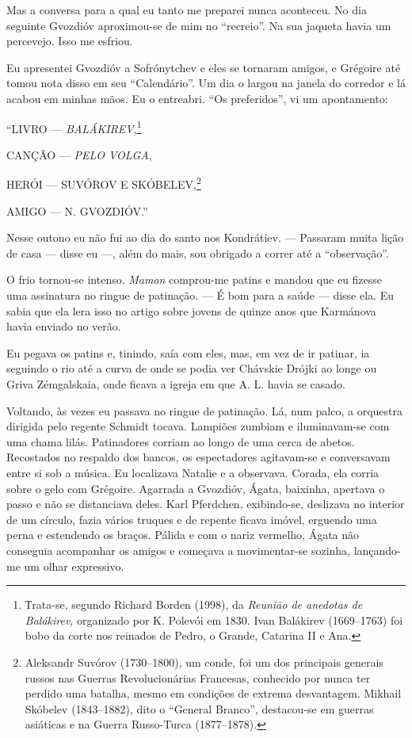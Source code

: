 Mas a conversa para a qual eu tanto me preparei nunca aconteceu. No dia
seguinte Gvozdióv aproximou-se de mim no ``recreio''. Na sua jaqueta
havia um percevejo. Isso me esfriou.

Eu apresentei Gvozdióv a Sofrónytchev e eles se tornaram amigos, e
Grégoire até tomou nota disso em seu ``Calendário''. Um dia o largou na
janela do corredor e lá acabou em minhas mãos. Eu o entreabri. ``Os
preferidos'', vi um apontamento:

``LIVRO --- \emph{BALÁKIREV},\footnote{Тrata-se, segundo Richard Borden
  (1998), da \emph{Reunião de anedotas de Balákirev}, organizado por K.
  Polevói em 1830. Ivan Balákirev (1669--1763) foi bobo da corte nos
  reinados de Pedro, o Grande, Catarina II e Ana.}

CANÇÃO --- \emph{PELO VOLGA},

HERÓI --- SUVÓROV E SKÓBELEV,\footnote{Aleksandr Suvórov (1730--1800),
  um conde, foi um dos principais generais russos nas Guerras
  Revolucionárias Francesas, conhecido por nunca ter perdido uma
  batalha, mesmo em condições de extrema desvantagem. Mikhail Skóbelev
  (1843--1882), dito o ``General Branco'', destacou-se em guerras
  asiáticas e na Guerra Russo-Turca (1877--1878).}

AMIGO --- N. GVOZDIÓV.''

Nesse outono eu não fui ao dia do santo nos Kondrátiev. --- Passaram
muita lição de casa --- disse eu ---, além do mais, sou obrigado a
correr até a ``observação''.

O frio tornou-se intenso. \emph{Maman} comprou-me patins e mandou que eu
fizesse uma assinatura no ringue de patinação. --- É bom para a saúde
--- disse ela. Eu sabia que ela lera isso no artigo sobre jovens de
quinze anos que Karmánova havia enviado no verão.

Eu pegava os patins e, tinindo, saía com eles, mas, em vez de ir
patinar, ia seguindo o rio até a curva de onde se podia ver Chávskie
Drójki ao longe ou Griva Zémgalskaia, onde ficava a igreja em que A. L.
havia se casado.

Voltando, às vezes eu passava no ringue de patinação. Lá, num palco, a
orquestra dirigida pelo regente Schmidt tocava. Lampiões zumbiam e
iluminavam-se com uma chama lilás. Patinadores corriam ao longo de uma
cerca de abetos. Recostados no respaldo dos bancos, os espectadores
agitavam-se e conversavam entre si sob a música. Eu localizava Natalie e
a observava. Corada, ela corria sobre o gelo com Grégoire. Agarrada a
Gvozdióv, Ágata, baixinha, apertava o passo e não se distanciava deles.
Karl Pferdchen, exibindo-se, deslizava no interior de um círculo, fazia
vários truques e de repente ficava imóvel, erguendo uma perna e
estendendo os braços. Pálida e com o nariz vermelho, Ágata não conseguia
acompanhar os amigos e começava a movimentar-se sozinha, lançando-me um
olhar expressivo.


